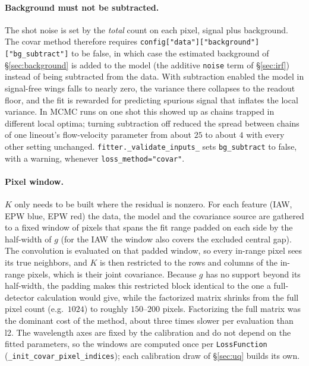 \documentclass[11pt]{article}
\newcommand{\code}[1]{\texttt{#1}}
\begin{document}
\paragraph{Background must not be subtracted.} The shot noise is set by the \emph{total}
count on each pixel, signal plus background. The covar method therefore requires
\code{config["data"]["background"]["bg\_subtract"]} to be false, in which case the
estimated background of \S\ref{sec:background} is added to the model (the additive
\code{noise} term of \S\ref{sec:irf}) instead of being subtracted from the data. With
subtraction enabled the model in signal-free wings falls to nearly zero, the variance
there collapses to the readout floor, and the fit is rewarded for predicting spurious
signal that inflates the local variance. In MCMC runs on one shot this showed up as chains
trapped in different local optima; turning subtraction off reduced the spread between
chains of one lineout's flow-velocity parameter from about $25$ to about $4$ with every
other setting unchanged. \code{fitter.\_validate\_inputs\_} sets \code{bg\_subtract} to
false, with a warning, whenever \code{loss\_method="covar"}.

\paragraph{Pixel window.} $K$ only needs to be built where the residual is nonzero. For
each feature (IAW, EPW blue, EPW red) the data, the model and the covariance source are
gathered to a fixed window of pixels that spans the fit range padded on each side by the
half-width of $g$ (for the IAW the window also covers the excluded central gap). The
convolution is evaluated on that padded window, so every in-range pixel sees its true
neighbors, and $K$ is then restricted to the rows and columns of the in-range pixels,
which is their joint covariance. Because $g$ has no support beyond its half-width, the
padding makes this restricted block identical to the one a full-detector calculation
would give, while the factorized matrix shrinks from the full pixel count (e.g.\ $1024$)
to roughly $150$--$200$ pixels. Factorizing the full matrix was the
dominant cost of the method, about three times slower per evaluation than l2. The
wavelength axes are fixed by the calibration and do not depend on the fitted parameters,
so the windows are computed once per \code{LossFunction}
(\code{\_init\_covar\_pixel\_indices}); each calibration draw of \S\ref{sec:uq} builds its
own.
\end{document}
